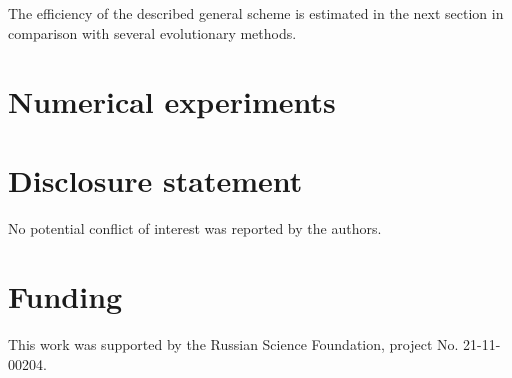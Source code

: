 \documentclass[]{interact}
\theoremstyle{plain}%
\theoremstyle{definition}
\theoremstyle{remark}
\begin{document}
The efficiency of the described general scheme is estimated in the next section in comparison with several evolutionary methods. 




\section{Numerical experiments}


\section*{Disclosure statement}

No potential conflict of interest was reported by the authors.

\section*{Funding}

This work was supported by the Russian Science Foundation, project No. 21-11-00204.





\end{document}
